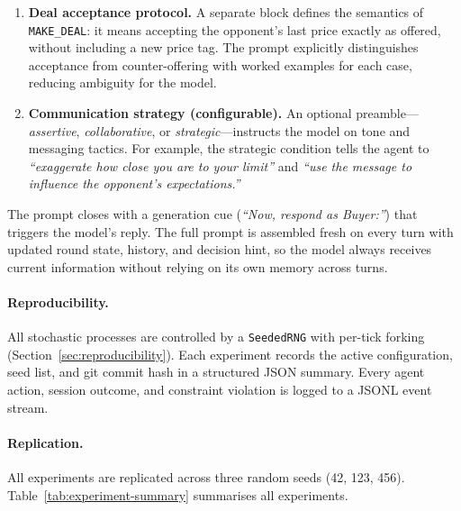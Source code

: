 \begin{enumerate}
\item \textbf{Deal acceptance protocol.}
A separate block defines the semantics of \texttt{MAKE\_DEAL}: it means accepting the opponent's last price exactly as offered, without including a new price tag.
The prompt explicitly distinguishes acceptance from counter-offering with worked examples for each case, reducing ambiguity for the model.

\item \textbf{Communication strategy (configurable).}
An optional preamble---\emph{assertive}, \emph{collaborative}, or \emph{strategic}---instructs the model on tone and messaging tactics. 
For example, the strategic condition tells the agent to 
\textit{``exaggerate how close you are to your limit''} and 
\textit{``use the message to influence the opponent's expectations.''}
\end{enumerate}

The prompt closes with a generation cue (\textit{``Now, respond as Buyer:''}) that triggers the model's reply. 
The full prompt is assembled fresh on every turn with updated round state, history, and decision hint, so the model always receives current information without relying on its own memory across turns.

\paragraph{Reproducibility.}
All stochastic processes are controlled by a \texttt{SeededRNG} with per-tick forking (Section~\ref{sec:reproducibility}).  Each experiment records the active configuration, seed list, and git commit hash in a structured JSON summary.  Every agent action, session outcome, and constraint violation is logged to a JSONL event stream.

\paragraph{Replication.}
All experiments are replicated across three random seeds (42, 123, 456).  Table~\ref{tab:experiment-summary} summarises all experiments.

